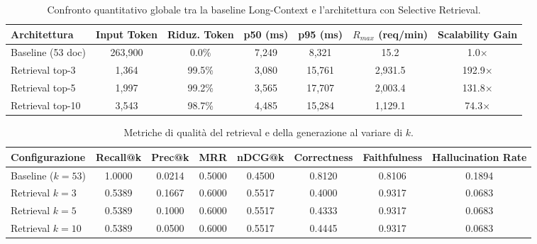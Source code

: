 
\begin{table}[htbp]
\centering
\small
\caption{Confronto quantitativo globale tra la baseline Long-Context e l'architettura con Selective Retrieval.}
\label{tab:ab_global_comparison}
\begin{tabular}{lcccccc}
\hline
\textbf{Architettura} & \textbf{Input Token} & \textbf{Riduz. Token} & \textbf{p50 (ms)} & \textbf{p95 (ms)} & \textbf{$R_{max}$ (req/min)} & \textbf{Scalability Gain} \\
\hline
Baseline (53 doc) & 263,900 & 0.0\% & 7,249 & 8,321 & 15.2 & 1.0$\times$ \\
Retrieval top-3 & 1,364 & 99.5\% & 3,080 & 15,761 & 2,931.5 & 192.9$\times$ \\
Retrieval top-5 & 1,997 & 99.2\% & 3,565 & 17,707 & 2,003.4 & 131.8$\times$ \\
Retrieval top-10 & 3,543 & 98.7\% & 4,485 & 15,284 & 1,129.1 & 74.3$\times$ \\
\hline
\end{tabular}
\end{table}

\begin{table}[htbp]
\centering
\small
\caption{Metriche di qualità del retrieval e della generazione al variare di $k$.}
\label{tab:retrieval_and_quality}
\begin{tabular}{lccccccc}
\hline
\textbf{Configurazione} & \textbf{Recall@k} & \textbf{Prec@k} & \textbf{MRR} & \textbf{nDCG@k} & \textbf{Correctness} & \textbf{Faithfulness} & \textbf{Hallucination Rate} \\
\hline
Baseline ($k=53$) & 1.0000 & 0.0214 & 0.5000 & 0.4500 & 0.8120 & 0.8106 & 0.1894 \\
Retrieval $k=3$ & 0.5389 & 0.1667 & 0.6000 & 0.5517 & 0.4000 & 0.9317 & 0.0683 \\
Retrieval $k=5$ & 0.5389 & 0.1000 & 0.6000 & 0.5517 & 0.4333 & 0.9317 & 0.0683 \\
Retrieval $k=10$ & 0.5389 & 0.0500 & 0.6000 & 0.5517 & 0.4445 & 0.9317 & 0.0683 \\
\hline
\end{tabular}
\end{table}

